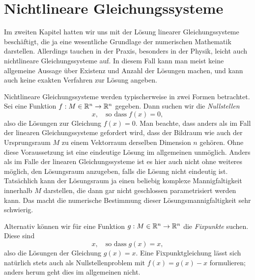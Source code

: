 % 

\chapter{Nichtlineare Gleichungssysteme}

Im zweiten Kapitel hatten wir uns mit der Lösung linearer
Gleichungssysteme beschäftigt, die ja eine wesentliche Grundlage der
numerischen Mathematik darstellen. Allerdings tauchen in der Praxis,
besonders in der Physik, leicht auch nichtlineare Gleichungssysteme
auf. In diesem Fall kann man meist keine allgemeine Aussage über
Existenz und Anzahl der Lösungen machen, und kann auch keine exakten
Verfahren zur Lösung angeben.

Nichtlineare Gleichungssysteme werden typischerweise in zwei Formen
betrachtet. Sei eine Funktion $f:M\in\mathbb{R}^n\to\mathbb{R}^n$ gegeben. Dann suchen
wir die \emph{Nullstellen}
\begin{equation}
  \label{eq:nullstellen}
  x, \quad\text{so dass}\; f(x) = 0,
\end{equation}
also die Lösungen zur Gleichung $f(x) = 0$. Man beachte, dass anders
als im Fall der linearen Gleichungssysteme gefordert wird, dass der
Bildraum wie auch der Ursprungsraum $M$ zu einem Vektorraum derselben
Dimension $n$ gehören. Ohne diese Voraussetzung ist eine eindeutige
Lösung im allgemeinen unmöglich. Anders als im Falle der linearen
Gleichungssysteme ist es hier auch nicht ohne weiteres möglich, den
Lösungsraum anzugeben, falls die Lösung nicht eindeutig
ist. Tatsächlich kann der Lösungsraum ja einen beliebig komplexe
Mannigfaltigkeit innerhalb $M$ darstellen, die dann gar nicht
geschlossen parametrisiert werden kann. Das macht die numerische
Bestimmung dieser Lösungsmannigfaltigkeit sehr schwierig.

Alternativ können wir für eine Funktion $g:M\in\mathbb{R}^n\to\mathbb{R}^n$ die
\emph{Fixpunkte} suchen. Diese sind
\begin{equation}
  \label{eq:fixpunkt}
  x, \quad\text{so dass}\; g(x) = x,
\end{equation}
also die Lösungen der Gleichung $g(x) = x$. Eine Fixpunktgleichung
lässt sich natürlich stets auch als Nullstellenproblem mit $f(x) =
g(x) - x$ formulieren; anders herum geht dies im allgemeinen nicht.

